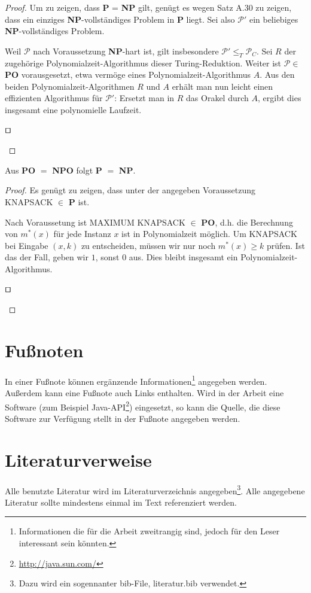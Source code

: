 \begin{proof} 
	Um zu zeigen, dass \textbf{P} = \textbf{NP} gilt, genügt es wegen Satz A.30 zu zeigen, dass ein einziges \textbf{NP}-vollständiges Problem in \textbf{P} liegt. Sei also $\mathcal{P}'$ ein beliebiges \textbf{NP}-vollständiges Problem.

	Weil $\mathcal{P}$ nach Voraussetzung \textbf{NP}-hart ist, gilt insbesondere $\mathcal{P}' \leq_T \mathcal{P}_C$. Sei $R$ der zugehörige Polynomialzeit-Algorithmus dieser Turing-Reduktion. Weiter ist $\mathcal{P} \in$ \textbf{PO} vorausgesetzt, etwa vermöge eines Polynomialzeit-Algorithmus $A$. Aus den beiden Polynomialzeit-Algorithmen $R$ und $A$ erhält man nun leicht einen effizienten Algorithmus für $\mathcal{P}'$: Ersetzt man in $R$ das Orakel durch $A$, ergibt dies insgesamt eine polynomielle Laufzeit. 
	\begin{flushright}
		$\qed$
	\end{flushright}
\end{proof}

\begin{lemma} 
	Aus \textbf{PO} $=$ \textbf{NPO} folgt \textbf{P} $=$ \textbf{NP}.
\end{lemma}

\begin{proof} 
	Es genügt zu zeigen, dass unter der angegeben Voraussetzung KNAPSACK $\in$ \textbf{P} ist.

	Nach Voraussetung ist MAXIMUM KNAPSACK $\in$ \textbf{PO}, d.h. die Berechnung von $m^*(x)$ für jede Instanz $x$ ist in Polynomialzeit möglich. Um KNAPSACK bei Eingabe $(x,k)$ zu entscheiden, müssen wir nur noch $m^*(x) \geq k$ prüfen. Ist das der Fall, geben wir $1$, sonst $0$ aus. Dies bleibt insgesamt ein Polynomialzeit-Algorithmus. 
	\begin{flushright}
		$\qed$
	\end{flushright}
\end{proof}

\section{Fußnoten}

In einer Fußnote können ergänzende Informationen\footnote{Informationen die für die Arbeit zweitrangig sind, jedoch für den Leser interessant sein könnten.} angegeben werden. Außerdem kann eine Fußnote auch Links enthalten. Wird in der Arbeit eine Software (zum Beispiel Java-API\footnote{\url{http://java.sun.com/}}) eingesetzt, so kann die Quelle, die diese Software zur Verfügung stellt in der Fußnote angegeben werden.

\section{Literaturverweise}
Alle benutzte Literatur wird im Literaturverzeichnis angegeben\footnote{Dazu wird ein sogennanter bib-File, literatur.bib verwendet.}. Alle angegebene Literatur sollte mindestens einmal im Text referenziert werden\cite{Coulouris:02}.
